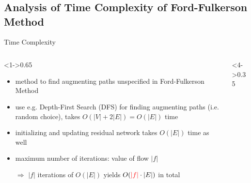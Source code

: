 \documentclass[aspectratio=169,c]{beamer} %
\begin{document}
\subsection*{Analysis of Time Complexity of Ford-Fulkerson Method}
\begin{frame}{Time Complexity}
    \begin{columns}[c]
        \begin{column}<1->{0.65\linewidth}
            
            \begin{itemize}[<+->]
                \item method to find augmenting paths unspecified in Ford-Fulkerson Method
                \item use e.g. Depth-First Search (DFS) for finding augmenting paths (i.e. random choice), takes \(O(\lvert V \rvert + 2\lvert E \rvert)=O(\lvert E\rvert)\) time
                \item initializing and updating residual network takes \(O(\lvert E\rvert)\) time as well
                \item maximum number of iterations: \color{red}value of flow \(\lvert f\rvert\)
                \item[\(\Rightarrow\)] \(\lvert f\rvert\) iterations of \(O(\lvert E\rvert)\) yields \(O({\color{red}\lvert f\rvert}\cdot \lvert E\rvert)\) in total
            \end{itemize}
        \end{column}
        \begin{column}<4->{0.35\linewidth}
        \end{column}
    \end{columns}
\end{frame}
\end{document}
